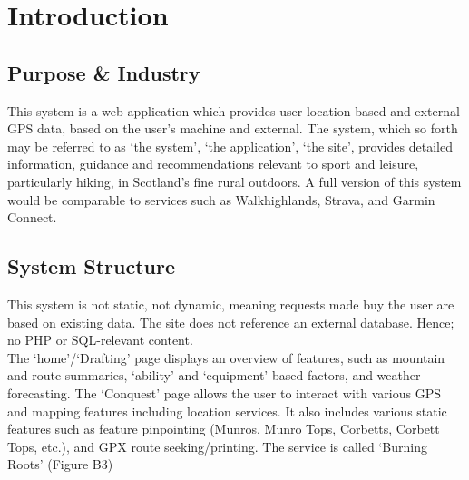 \documentclass[11pt, english]{article}
\begin{document}
\newpage

	\renewcommand{\contentsname}{Table of Contents}

	\tableofcontents

\newpage

	\listoftables

\newpage

	\listoffigures

\newpage


\section{Introduction}\label{ch1}

	\subsection{Purpose \& Industry}

	This system is a web application which provides user-location-based and external GPS data, based on the user's machine and external. The system, which so forth may be referred to as `the system', `the application', `the site', provides detailed information, guidance and recommendations relevant to sport and leisure, particularly hiking, in Scotland's fine rural outdoors. A full version of this system would be comparable to services such as Walkhighlands, Strava, and Garmin Connect.

	\subsection{System Structure}

	This system is not static, not dynamic, meaning requests made buy the user are based on existing data. The site does not reference an external database. Hence; no PHP or SQL-relevant content.\\

	The `home'/`Drafting' page displays an overview of features, such as mountain and route summaries, `ability' and `equipment'-based factors, and weather forecasting. The `Conquest' page allows the user to interact with various GPS and mapping features including location services. It also includes various static features such as feature pinpointing (Munros, Munro Tops, Corbetts, Corbett Tops, etc.), and GPX route seeking/printing. The service is called `Burning Roots' (Figure B3)\\
\end{document}
